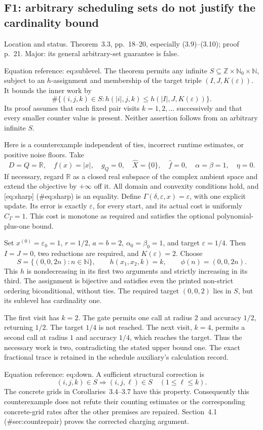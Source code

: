 \documentclass[10pt]{article}
\begin{document}
\subsection*{F1: arbitrary scheduling sets do not justify the cardinality bound}
Location and status. Theorem 3.3, pp. 18–20, especially (3.9)–(3.10); proof p. 21. Major: its general arbitrary-set guarantee is false.\par
Equation reference: eq:sublevel. The theorem permits any infinite \(S\subseteq\mathbb Z\times\mathbb N_0\times\mathbb N\), subject to an \(h\)-assignment and membership of the target triple \((I,J,K(\varepsilon))\). It bounds the inner work by \[
 \#\{(i,j,k)\in S:
 h(|i|,j,k)\le h(|I|,J,K(\varepsilon))\}.\] Its proof assumes that each fixed pair visits \(k=1,2,\ldots\) successively and that every smaller counter value is present. Neither assertion follows from an arbitrary infinite \(S\).\par
Here is a counterexample independent of ties, incorrect runtime estimates, or positive noise floors. Take \[D=Q=\mathbb R,\quad f(x)=|x|,\quad g_Q=0,\quad
 \widehat X=\{0\},\quad \widehat f=0,\quad
 \alpha=\beta=1,\quad\eta=0.\] If necessary, regard \(\mathbb R\) as a closed real subspace of the complex ambient space and extend the objective by \(+\infty\) off it. All domain and convexity conditions hold, and [eq:sharp] (\#eq:sharp) is an equality. Define \(\Gamma(\delta,\varepsilon,x)=\varepsilon\), with one explicit update. Its error is exactly \(\varepsilon\), for every start, and its actual cost is uniformly \(C_\Gamma=1\). This cost is monotone as required and satisfies the optional polynomial-plus-one bound.\par
Set \(x^{(0)}=\varepsilon_0=1\), \(r=1/2\), \(a=b=2\), \(\alpha_0=\beta_0=1\), and target \(\varepsilon=1/4\). Then \(I=J=0\), two reductions are required, and \(K(\varepsilon)=2\). Choose \[S=\{(0,0,2n):n\in\mathbb N\},\qquad h(x_1,x_2,k)=k,\qquad
 \phi(n)=(0,0,2n).\] This \(h\) is nondecreasing in its first two arguments and strictly increasing in its third. The assignment is bijective and satisfies even the printed non-strict ordering biconditional, without ties. The required target \((0,0,2)\) lies in \(S\), but its sublevel has cardinality one.\par
The first visit has \(k=2\). The gate permits one call at radius \(2\) and accuracy \(1/2\), returning \(1/2\). The target \(1/4\) is not reached. The next visit, \(k=4\), permits a second call at radius \(1\) and accuracy \(1/4\), which reaches the target. Thus the necessary work is two, contradicting the stated upper bound one. The exact fractional trace is retained in the schedule auxiliary’s calculation record.\par
Equation reference: eq:down. A sufficient structural correction is \[
 (i,j,k)\in S\Longrightarrow(i,j,\ell)\in S
 \quad(1\le\ell\le k).\] The concrete grids in Corollaries 3.4–3.7 have this property. Consequently this counterexample does not refute their counting estimates or the corresponding concrete-grid rates after the other premises are repaired. Section 4.1 (\#sec:countrepair) proves the corrected charging argument.\par
\end{document}

